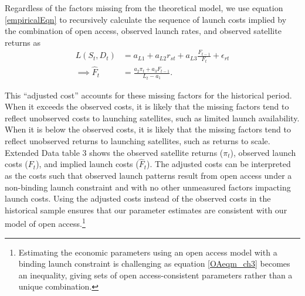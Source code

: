\documentclass[9pt,twoside,lineno]{pnas-new}
\begin{document}
Regardless of the factors missing from the theoretical model, we use equation \ref{empiricalEqn} to recursively calculate the sequence of launch costs implied by the combination of open access, observed launch rates, and observed satellite returns as
\begin{align}
L(S_t,D_t) &= a_{L 1} + a_{L 2} r_{st} + a_{L 3} \frac{F_{t-1}}{F_t} + \epsilon_{r t} \nonumber \\
\implies \hat{F}_t &=	\frac{a_2 \pi_t + a_3 F_{t-1}}{L_t - a_1}.
\label{recursive_impliedcosts}
\end{align}

This ``adjusted cost'' accounts for these missing factors for the historical period. When it exceeds the observed costs, it is likely that the missing factors tend to reflect unobserved costs to launching satellites, such as limited launch availability. When it is below the observed costs, it is likely that the missing factors tend to reflect unobserved returns to launching satellites, such as returns to scale.  \\

Extended Data table 3 shows the observed satellite returns ($\pi_t$), observed launch costs ($F_t$), and implied launch costs ($\hat{F}_t$). The adjusted costs can be interpreted as the costs such that observed launch patterns result from open access under a non-binding launch constraint and with no other unmeasured factors impacting launch costs. Using the adjusted costs instead of the observed costs in the historical sample ensures that our parameter estimates are consistent with our model of open access.\footnote{Estimating the economic parameters using an open access model with a binding launch constraint is challenging as equation \ref{OAeqm_ch3} becomes an inequality, giving sets of open access-consistent parameters rather than a unique combination.}
\end{document}
